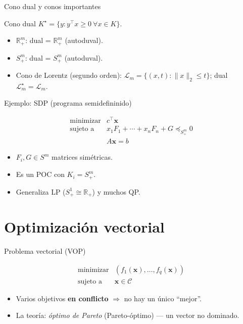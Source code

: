\documentclass[10pt,aspectratio=169]{beamer}
\newcommand{\R}{\mathbb{R}}
\newcommand{\x}{\mathbf{x}}
\newcommand{\0}{\mathbf{0}}
\begin{document}
\begin{frame}{Cono dual y conos importantes}
  \begin{block}{Cono dual}
    $K^\star=\{y:y^\top x\ge 0\ \forall x\in K\}$.
  \end{block}
  \begin{itemize}
    \item $\R_+^m$: dual = $\R_+^m$ (autoduval).
    \item $S_+^m$: dual = $S_+^m$ (autoduval).
    \item Cono de Lorentz (segundo orden):
      $\mathcal{L}_m=\{(x,t):\|x\|_2\le t\}$; dual $\mathcal{L}_m^\star=\mathcal{L}_m$.
  \end{itemize}
\end{frame}

\begin{frame}{Ejemplo: SDP (programa semidefininido)}
  \begin{block}{}
    \[
      \begin{array}{ll}
        \text{minimizar} & c^\top\x \\
        \text{sujeto a}  & x_1 F_1+\cdots+x_n F_n + G\preceq_{S_+^m} 0\\
                         & A\x=b
      \end{array}
    \]
  \end{block}
  \begin{itemize}
    \item $F_i,G\in S^m$ matrices simétricas.
    \item Es un POC con $K_i=S_+^m$.
    \item Generaliza LP ($S_+^1\cong\R_+$) y muchos QP.
  \end{itemize}
\end{frame}

\section{Optimización vectorial}
\begin{frame}{Problema vectorial (VOP)}
  \begin{block}{}
    \[
      \begin{array}{ll}
      \text{minimizar} & (f_1(\x),\dots,f_q(\x)) \\
      \text{sujeto a}  & \x\in\mathcal{C}
      \end{array}
    \]
  \end{block}
  \begin{itemize}
    \item Varios objetivos \textbf{en conflicto} $\Rightarrow$ no hay un único ``mejor''.
    \item La teoría: \emph{óptimo de Pareto} (Pareto-óptimo) --- un vector no dominado.
  \end{itemize}
\end{frame}
\end{document}
